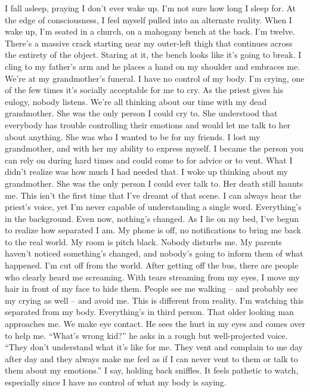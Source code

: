 \documentclass[a4paper, 12pt]{book}
\newcommand\tab[1][1cm]{\hspace*{#1}}
\begin{document}
\newline
\tab
I fall asleep, praying I don’t ever wake up. I’m not sure how long I sleep for. At the edge of consciousness, I feel myself pulled into an alternate reality. When I wake up, I’m seated in a church, on a mahogany bench at the back. I’m twelve. There’s a massive crack starting near my outer-left thigh that continues across the entirety of the object. Staring at it, the bench looks like it’s going to break. I cling to my father’s arm and he places a hand on my shoulder and embraces me. We’re at my grandmother’s funeral.
\newline
\tab
I have no control of my body. I’m crying, one of the few times it’s socially acceptable for me to cry. As the priest gives his eulogy, nobody listens. We’re all thinking about our time with my dead grandmother. She was the only person I could cry to. She understood that everybody has trouble controlling their emotions and would let me talk to her about anything. She was who I wanted to be for my friends. I lost my grandmother, and with her my ability to express myself. I became the person you can rely on during hard times and could come to for advice or to vent. What I didn’t realize was how much I had needed that.
\newline
\tab
I woke up thinking about my grandmother. She was the only person I could ever talk to. Her death still haunts me. This isn’t the first time that I’ve dreamt of that scene. I can always hear the priest’s voice, yet I’m never capable of understanding a single word. Everything’s in the background. Even now, nothing’s changed. As I lie on my bed, I’ve begun to realize how separated I am. My phone is off, no notifications to bring me back to the real world. My room is pitch black. Nobody disturbs me. My parents haven’t noticed something’s changed, and nobody’s going to inform them of what happened. I’m cut off from the world.
\newline
\tab
After getting off the bus, there are people who clearly heard me screaming. With tears streaming from my eyes, I move my hair in front of my face to hide them. People see me walking -- and probably see my crying as well -- and avoid me. This is different from reality. I’m watching this separated from my body. Everything’s in third person. That older looking man approaches me. We make eye contact. He sees the hurt in my eyes and comes over to help me. ``What’s wrong kid?'' he asks in a rough but well-projected voice.
\newline
\tab
``They don’t understand what it’s like for me. They vent and complain to me day after day and they always make me feel as if I can never vent to them or talk to them about my emotions.'' I say, holding back sniffles. It feels pathetic to watch, especially since I have no control of what my body is saying.
\end{document}
